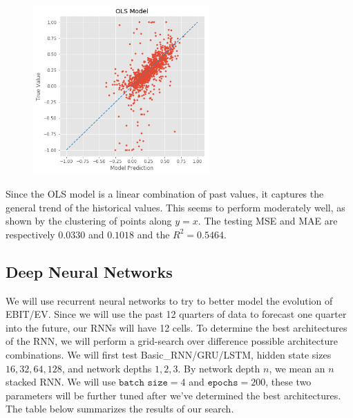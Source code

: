 \documentclass[11pt, letterpaper, headings=standardclasses]{scrartcl}
\begin{document}
	\begin{figure}[H]
    \centering
    \includegraphics[width=0.6\textwidth]{ols_plot.png}
    \end{figure}
	
	Since the OLS model is a linear combination of past values, it captures the general trend of the historical values. This seems to perform moderately well, as shown by the clustering of points along $y=x$. The testing MSE and MAE are respectively $0.0330$ and $0.1018$ and the $R^2 = 0.5464$.
	
	\subsection{Deep Neural Networks}
	We will use recurrent neural networks to try to better model the evolution of EBIT/EV. Since we will use the past 12 quarters of data to forecast one quarter into the future, our RNNs will have 12 cells. To determine the best architectures of the RNN, we will perform a grid-search over difference possible architecture combinations. We will first test Basic\_RNN/GRU/LSTM, hidden state sizes $16,32,64,128$, and network depths $1,2,3$. By network depth $n$, we mean an $n$ stacked RNN. We will use $\texttt{batch size}=4$ and $\texttt{epochs}=200$, these two parameters will be further tuned after we've determined the best architectures. The table below summarizes the results of our search.
\end{document}
